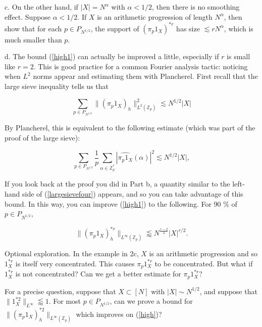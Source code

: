 \documentclass{amsart}
\newcommand{\ZZ}{\mathbb{Z}}
\begin{document}
\vskip5pt

c.  On the other hand,  if $|X| = N^\alpha$ with $\alpha < 1/2$,  then there is no smoothing effect.  Suppose $\alpha < 1/2$.   If $X$ is an arithmetic progression of length $N^\alpha$,  then show that for each $p \in P_{N^{1/2}}$,  the support of $(\pi_p 1_X)^{*r}$ has size $\lesssim r N^\alpha$,  which is much smaller than $p$.   

\vskip5pt

d.  The bound (\ref{high1}) can actually be improved a little,  especially if $r$ is small like $r=2$.   This is good practice for a common Fourier analysis tactic: noticing when $L^2$ norms appear and estimating them with Plancherel.   First recall that the large sieve inequality tells us that

\begin{equation}\label{largesieve}
\sum_{p \in P_{N^{1/2}}} \| (\pi_p 1_X)_h \|_{L^2(\ZZ_p)}^2 \lesssim N^{1/2} |X|
\end{equation}

By Plancherel,  this is equivalent to the following estimate (which was part of the proof of the large sieve):

\begin{equation} \label{largesievefour} \sum_{p \in P_{N^{1/2}}} \frac{1}{p} \sum_{\alpha \in \ZZ_p^*}  \left| \widehat{\pi_p 1_X} (\alpha) \right|^2   \lesssim N^{1/2} |X|,  \end{equation}

If you look back at the proof you did in Part b, a quantity similar to the left-hand side of (\ref{largesievefour}) appears, and so you can take advantage of this bound.   In this way,  you can improve (\ref{high1}) to the following.   For 90 \% of $p \in P_{N^{1/2}}$, 


\begin{equation} \label{high}  \| (\pi_p 1_X)^{*r}_h \|_{L^\infty(\ZZ_p)} \lessapprox  N^{\frac{r-2}{4}} |X|^{r/2}. \end{equation}

\vskip20pt

Optional exploration.   In the example in 2c,  $X$ is an arithmetic progression and so $1_X^{*r}$ is itself very concentrated.  This causes $\pi_p 1_X^{*r}$ to be concentrated.   But what if $1_X^{*r}$ is not concentrated?  Can we get a better estimate for $\pi_p 1_X^{*r}$?

For a precise question,  suppose that $ X \subset [N]$ with $|X| \sim N^{1/2}$,  and suppose that $\| 1_X^{*2} \|_{L^\infty} \lessapprox 1$.    For most $p \in P_{N^{1/2}}$, can we prove a bound for $ \| (\pi_p 1_X)^{*2}_h \|_{L^\infty(\ZZ_p)} $ which improves on (\ref{high})?
\end{document}
